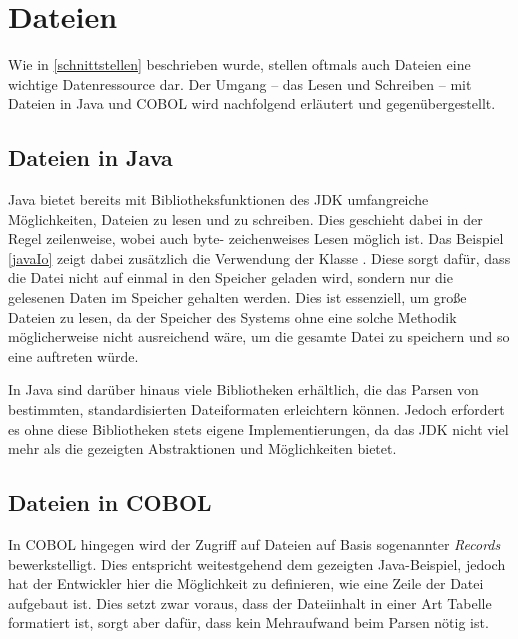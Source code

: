 \section{Dateien} \label{dateien}
Wie in \autoref{schnittstellen} beschrieben wurde, stellen oftmals auch Dateien eine wichtige Datenressource dar. Der Umgang -- das Lesen und Schreiben -- mit Dateien in Java und COBOL wird nachfolgend erläutert und gegenübergestellt.

\subsection*{Dateien in Java}

Java bietet bereits mit Bibliotheksfunktionen des JDK umfangreiche Möglichkeiten, Dateien zu lesen und zu schreiben. Dies geschieht dabei in der Regel zeilenweise, wobei auch byte- \bzw zeichenweises Lesen möglich ist. Das Beispiel \autoref{javaIo} zeigt dabei zusätzlich die Verwendung der Klasse . Diese sorgt dafür, dass die Datei nicht auf einmal in den Speicher geladen wird, sondern nur die gelesenen Daten im Speicher gehalten werden. Dies ist essenziell, um große Dateien zu lesen, da der Speicher des Systems ohne eine solche Methodik möglicherweise nicht ausreichend wäre, um die gesamte Datei zu speichern und so eine  auftreten würde.


In Java sind darüber hinaus viele Bibliotheken erhältlich, die das Parsen von bestimmten, standardisierten Dateiformaten erleichtern können. Jedoch erfordert es ohne diese Bibliotheken stets eigene Implementierungen, da das JDK nicht viel mehr als die gezeigten Abstraktionen und Möglichkeiten bietet.

\subsection*{Dateien in COBOL}\label{filesCobol}

In COBOL hingegen wird der Zugriff auf Dateien auf Basis sogenannter \textit{Records} bewerkstelligt. Dies entspricht weitestgehend dem gezeigten Java-Beispiel, jedoch hat der Entwickler hier die Möglichkeit zu definieren, wie eine Zeile der Datei aufgebaut ist. Dies setzt zwar voraus, dass der Dateiinhalt in einer Art Tabelle formatiert ist, sorgt aber dafür, dass kein Mehraufwand beim Parsen nötig ist. 

